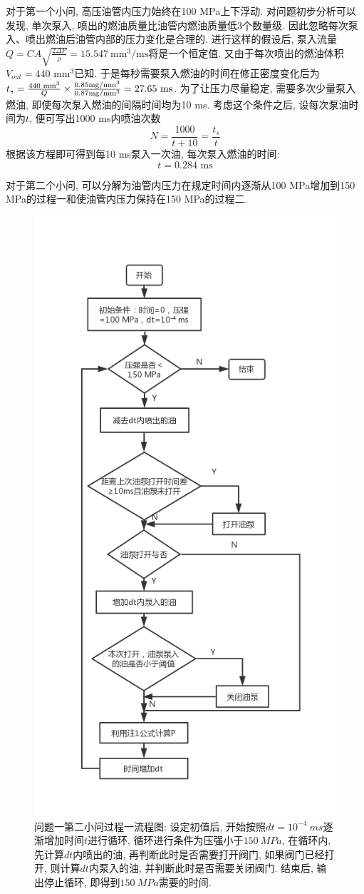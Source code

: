 \documentclass{cumcmthesis}
\begin{document}
对于第一个小问, 高压油管内压力始终在100 MPa上下浮动. 对问题初步分析可以发现, 单次泵入, 喷出的燃油质量比油管内燃油质量低3个数量级. 因此忽略每次泵入、喷出燃油后油管内部的压力变化是合理的. 进行这样的假设后, 泵入流量$Q = CA\sqrt{\frac{2\Delta P}{\rho}} = 15.547\ \text{mm}^3/\text{ms}$将是一个恒定值. 又由于每次喷出的燃油体积$V_{out} = 440\text{ mm}^3$已知. 于是每秒需要泵入燃油的时间在修正密度变化后为$t_{s} = \frac{440\text{ mm}^3}{Q} \times \frac{0.85 \rm{mg/mm^3}}{0.87 \rm{mg/mm^3}} = 27.65\text{ ms} $. 为了让压力尽量稳定, 需要多次少量泵入燃油, 即使每次泵入燃油的间隔时间均为10 ms. 考虑这个条件之后, 设每次泵油时间为$t$, 便可写出1000 ms内喷油次数
$$N = \frac{1000}{t+10}=\frac{t_s}{t}$$
根据该方程即可得到每10 ms泵入一次油, 每次泵入燃油的时间:
$$\boxed{t = 0.284\text{ ms}}$$ 

对于第二个小问, 可以分解为油管内压力在规定时间内逐渐从100 MPa增加到150 MPa的过程一和使油管内压力保持在150 MPa的过程二. 

\begin{figure}[htbp]
    \centering
    \includegraphics[width = 0.5\linewidth]{q1.jpg}
    \caption{问题一第二小问过程一流程图: 设定初值后, 开始按照$dt = 10^{-4}\ ms$逐渐增加时间$t$进行循环, 循环进行条件为压强小于$150\ MPa$, 在循环内, 先计算$dt$内喷出的油, 再判断此时是否需要打开阀门, 如果阀门已经打开, 则计算$dt$内泵入的油, 并判断此时是否需要关闭阀门. 结束后, 输出停止循环, 即得到$150\ MPa$需要的时间. }
    \label{121}
\end{figure}
\end{document}
